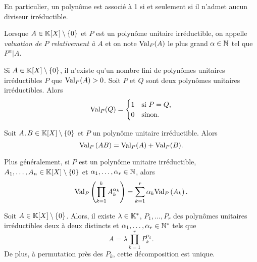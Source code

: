 \documentclass{magnolia}
\begin{document}
\begin{remarqueUnique}
\remarque En particulier, un polynôme est associé à 1 si et seulement si il n'admet
  aucun diviseur irréductible.
\end{remarqueUnique}


\begin{definition}
Lorsque $A\in\polyK\setminus\ens{0}$ et $P$ est un polynôme unitaire irréductible, on appelle \emph{valuation de
$P$ relativement à $A$} et on note ${\rm Val}_P(A)$ le plus grand
$\alpha\in\mathbb{N}$ tel que $P^\alpha|A$.
\end{definition}

\begin{remarques}
\remarque Si $A\in\polyK\setminus\ens{0}$, il n'existe qu'un nombre fini de polynômes unitaires irréductibles
  $P$ que ${\rm Val}_P(A)>0$.
\remarque Soit $P$ et $Q$ sont deux polynômes unitaires irréductibles. Alors
  \[{\rm Val}_P(Q)=\begin{cases}
    1 & \text{si $P=Q$,}\\
    0 & \text{sinon.}
  \end{cases}\]
\end{remarques}

\begin{proposition}
Soit $A,B\in\polyK\setminus\ens{0}$ et $P$ un polynôme unitaire irréductible. Alors
\[{\rm Val}_P\left(AB\right)={\rm Val}_P(A)+{\rm Val}_P(B).\]
\end{proposition}

\begin{remarqueUnique}
\remarque Plus généralement, si $P$ est un polynôme unitaire irréductible, $A_1,\ldots,A_n\in\polyK\setminus\ens{0}$ et $\alpha_1,\ldots,\alpha_r\in\mathbb{N}$, alors
\[{\rm Val}_P\left(\prod_{k=1}^k A_k^{\alpha_k}\right)=\sum_{k=1}^r \alpha_k {\rm Val}_P\left(A_k\right).\]
\end{remarqueUnique}

\begin{proposition}
Soit $A\in\polyK\setminus\ens{0}$. Alors, il existe $\lambda\in\mathbb{K}^*$,
$P_1,\ldots,P_r$ des polynômes unitaires irréductibles deux à deux distincts et
$\alpha_1,\ldots,\alpha_r\in{\mathbb{N}^*}$ tels que
\[A=\lambda \prod_{k=1}^r P_k^{\alpha_k}.\]
De plus, à permutation près des $P_k$, cette décomposition est unique.
\end{proposition}
\end{document}

